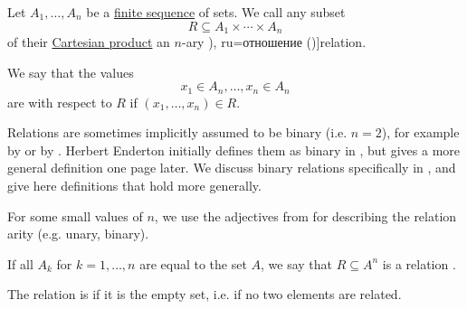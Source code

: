 \begin{definition}\label{def:relation}
  Let \( A_1, \ldots, A_n \) be a \hyperref[def:sequence]{finite sequence} of sets. We call any subset
  \begin{equation*}
    R \subseteq A_1 \times \cdots \times A_n
  \end{equation*}
  of their \hyperref[def:cartesian_product/product]{Cartesian product} an \( n \)-ary \term[bg=релация (\cite[367]{ГеновМиховскиМоллов1991}), ru=отношение (\cite[25]{КолмогоровДрагалин2006})]{relation}.

  We say that the values
  \begin{equation*}
    x_1 \in A_n, \ldots, x_n \in A_n
  \end{equation*}
  are  with respect to \( R \) if \( (x_1, \ldots, x_n) \in R \).

  Relations are sometimes implicitly assumed to be binary (i.e. \( n = 2 \)), for example by  or by . Herbert Enderton initially defines them as binary in , but gives a more general definition one page later. We discuss binary relations specifically in , and give here definitions that hold more generally.

  \begin{thmenum}[series=def:relation]
     For some small values of \( n \), we use the adjectives from  for describing the relation arity (e.g. unary, binary).

     If all \( A_k \) for \( k = 1, \ldots, n \) are equal to the set \( A \), we say that \( R \subseteq A^n \) is a relation .

     The relation is  if it is the empty set, i.e. if no two elements are related.
  \end{thmenum}
\end{definition}

